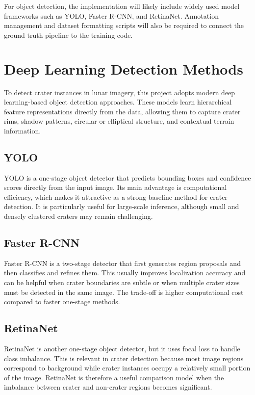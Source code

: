 \documentclass[conference]{IEEEtran}
\begin{document}
	For object detection, the implementation will likely include widely used model frameworks such as YOLO, Faster R-CNN, and RetinaNet. Annotation management and dataset formatting scripts will also be required to connect the ground truth pipeline to the training code.
	
	\section{Deep Learning Detection Methods}
	To detect crater instances in lunar imagery, this project adopts modern deep learning-based object detection approaches. These models learn hierarchical feature representations directly from the data, allowing them to capture crater rims, shadow patterns, circular or elliptical structure, and contextual terrain information.
	
	\subsection{YOLO}
	YOLO is a one-stage object detector that predicts bounding boxes and confidence scores directly from the input image. Its main advantage is computational efficiency, which makes it attractive as a strong baseline method for crater detection. It is particularly useful for large-scale inference, although small and densely clustered craters may remain challenging.
	
	\subsection{Faster R-CNN}
	Faster R-CNN is a two-stage detector that first generates region proposals and then classifies and refines them. This usually improves localization accuracy and can be helpful when crater boundaries are subtle or when multiple crater sizes must be detected in the same image. The trade-off is higher computational cost compared to faster one-stage methods.
	
	\subsection{RetinaNet}
	RetinaNet is another one-stage object detector, but it uses focal loss to handle class imbalance. This is relevant in crater detection because most image regions correspond to background while crater instances occupy a relatively small portion of the image. RetinaNet is therefore a useful comparison model when the imbalance between crater and non-crater regions becomes significant.
	
\end{document}

